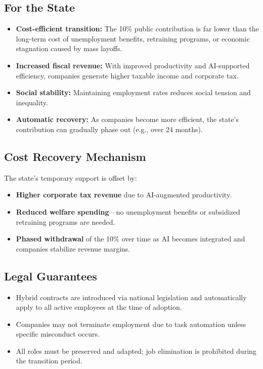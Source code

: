 \documentclass[12pt]{article}
\begin{document}
\subsection{For the State}

\begin{itemize}
  \item \textbf{Cost-efficient transition:} The 10\% public contribution is far lower than the long-term cost of unemployment benefits, retraining programs, or economic stagnation caused by mass layoffs.
  \item \textbf{Increased fiscal revenue:} With improved productivity and AI-supported efficiency, companies generate higher taxable income and corporate tax.
  \item \textbf{Social stability:} Maintaining employment rates reduces social tension and inequality.
  \item \textbf{Automatic recovery:} As companies become more efficient, the state's contribution can gradually phase out (e.g., over 24 months).
\end{itemize}

\subsection{Cost Recovery Mechanism}

The state's temporary support is offset by:
\begin{itemize}
  \item \textbf{Higher corporate tax revenue} due to AI-augmented productivity.
  \item \textbf{Reduced welfare spending}—no unemployment benefits or subsidized retraining programs are needed.
  \item \textbf{Phased withdrawal} of the 10\% over time as AI becomes integrated and companies stabilize revenue margins.
\end{itemize}

\subsection{Legal Guarantees}

\begin{itemize}
  \item Hybrid contracts are introduced via national legislation and automatically apply to all active employees at the time of adoption.
  \item Companies may not terminate employment due to task automation unless specific misconduct occurs.
  \item All roles must be preserved and adapted; job elimination is prohibited during the transition period.
\end{itemize}
\end{document}
